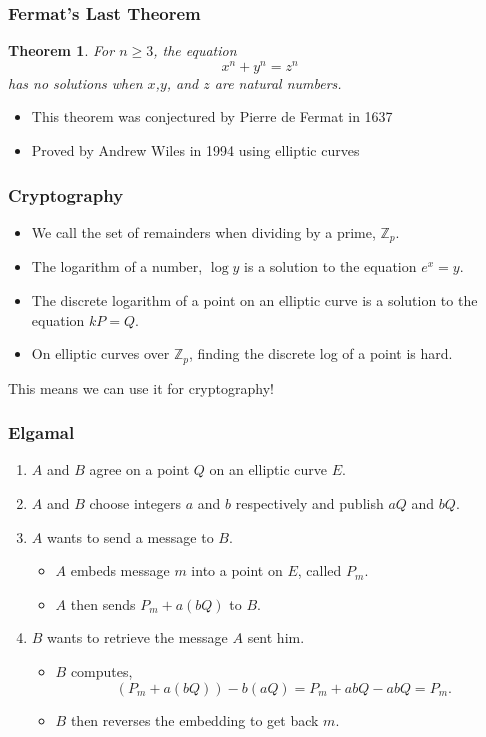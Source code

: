 \documentclass[xcolor=pdftex,dvipsnames,table]{beamer}
\theoremstyle{plain}
\newtheorem{thm}{Theorem}
\theoremstyle{definition}
\def\ZZ{\mathbb{Z}}
\begin{document}
\begin{frame}
	\frametitle{Fermat's Last Theorem}

	\begin{thm}
	For $n\geq 3$, the equation
	\[
		x^n+y^n = z^n
	\]
	has no solutions when $x$,$y$, and $z$ are natural numbers.
	\end{thm}

	\begin{itemize}
	\item This theorem was conjectured by Pierre de Fermat in 1637
	\item Proved by Andrew Wiles in 1994 using elliptic curves
	\end{itemize}
\end{frame}

\begin{frame}
	\frametitle{Cryptography}

	\begin{itemize}
	\item We call the set of remainders when dividing by a prime, $\ZZ_p$.
	\item The logarithm of a number, $\log y$ is a solution to the equation $e^x=y$.
	\item The discrete logarithm of a point on an elliptic curve is a solution to the equation $kP=Q$.
	\item On elliptic curves over $\ZZ_p$, finding the discrete log of a point is hard.
	\end{itemize}

	This means we can use it for cryptography!
\end{frame}

\begin{frame}
	\frametitle{Elgamal}

	\begin{enumerate}
		\item $A$ and $B$ agree on a point $Q$ on an elliptic curve $E$.
		\item $A$ and $B$ choose integers $a$ and $b$ respectively and publish $aQ$ and $bQ$.
		\item $A$ wants to send a message to $B$.
		\begin{itemize}
			\item $A$ embeds message $m$ into a point on $E$, called $P_m$.
			\item $A$ then sends $P_m+a(bQ)$ to $B$.
		\end{itemize}
		\item $B$ wants to retrieve the message $A$ sent him.
		\begin{itemize}
			\item $B$ computes,
			\[
				(P_m+a(bQ))-b(aQ)=P_m+abQ-abQ=P_m.
			\]
			\item $B$ then reverses the embedding to get back $m$.
		\end{itemize}
	\end{enumerate}
\end{frame}
\end{document}
